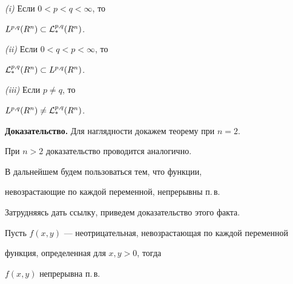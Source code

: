 \begin{thm}


{\em (i)} Если $0<p<q<\infty$, то


$L^{p,q}(R^n) \subset {\cal L}_*^{p,q}(R^n)$.





{\em (ii)} Если $0<q<p<\infty$, то


${\cal L}_{\ast}^{p,q}(R^n) \subset L^{p,q}(R^n)$.





{\em (iii)} Если $p \ne q$, то


$L^{p,q}(R^n) \neq {\cal L}_*^{p,q}(R^n)$.


\end{thm}








{\bf Доказательство.} Для наглядности докажем теорему при $n=2$.


При $n>2$ доказательство проводится аналогично.





В дальнейшем будем пользоваться тем, что функции,


невозрастающие по каждой переменной, непрерывны п.\,в.


Затрудняясь дать ссылку, приведем доказательство этого факта.





\begin{lemnonum} 


Пусть $f(x,y)$ --- неотрицательная, невозрастающая по каждой переменной


функция, определенная для $x,y>0$, тогда


$f(x,y)$ непрерывна п.\,в.


\end{lemnonum}





